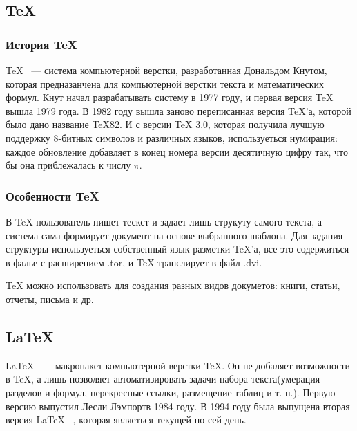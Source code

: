 \documentclass[14pt,a4paper]{article}
\begin{document}
\subsection{\TeX}
\subsubsection{История \TeX}
\TeX{} \cite{wikiTeX:website} ~--- система компьютерной верстки, разработанная
Дональдом Кнутом, которая предназанчена для компьютерной верстки текста и математических формул. Кнут
начал разрабатывать систему в 1977 году, и первая версия \TeX{} вышла 1979
года. В 1982 году вышла заново переписанная версия \TeX'а, которой было дано
название TeX82. И с версии \TeX{} 3.0, которая получила лучшую поддержку
8-битных символов и различных языков, используеться нумирация: каждое обновление
добавляет в конец номера версии десятичную цифру так, что бы она приблежалась к
числу \begin{math} \pi \end{math}.

\subsubsection{Особенности \TeX}
В \TeX{} пользователь пишет тескст и задает лишь струкуту самого текста, а система
сама формирует документ на основе выбранного шаблона. Для задания структуры
используеться собственный язык разметки \TeX'а, все это содержиться в фалье с
расширением .tor, и \TeX{} транслирует в файл .dvi.

\TeX{} можно использовать для создания разных видов докуметов: книги, статьи,
отчеты, письма и др.

\subsection{\LaTeX}
\LaTeX{} \cite{wikiLaTeX:website}~--- макропакет компьютерной верстки \TeX{}. Он
не добаляет возможности в \TeX{}, а лишь позволяет автоматизировать задачи набора текста(умерация
разделов и формул, перекресные ссылки, размещение таблиц и т. п.). Первую версию
выпустил Лесли Лэмпортв 1984 году. В 1994 году была выпущена вторая версия
\LaTeX -- \LaTeXe{}, которая являеться текущей по сей день.
\end{document}
